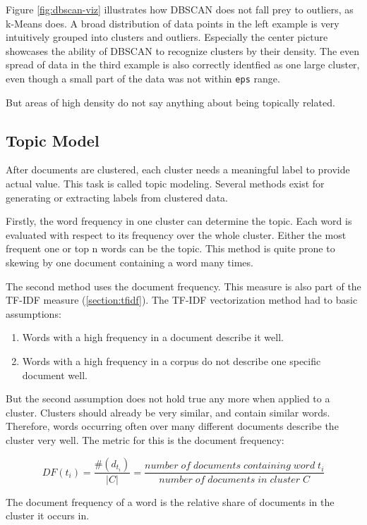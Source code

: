 		Figure \ref{fig:dbscan-viz} illustrates how \ac{DBSCAN} does not fall prey to outliers, as k-Means does. A broad distribution of data points in the left example is very intuitively grouped into clusters and outliers. Especially the center picture showcases the ability of DBSCAN to recognize clusters by their density. The even spread of data in the third example is also correctly identfied as one large cluster, even though a small part of the data was not within \lstinline|eps| range.
		
		But areas of high density do not say anything about being topically related.

		
\subsection{Topic Model}
After documents are clustered, each cluster needs a meaningful label to provide actual value. This task is called topic modeling. Several methods exist for generating or extracting labels from clustered data. 

Firstly, the word frequency in one cluster can determine the topic. Each word is evaluated with respect to its frequency over the whole cluster. Either the most frequent one or top n words can be the topic.
This method is quite prone to skewing by one document containing a word many times.

The second method uses the document frequency. This measure is also part of the \ac{TF-IDF} measure (\ref{section:tfidf}).
The \ac{TF-IDF} vectorization method had to basic assumptions:
\begin{enumerate}
	\item Words with a high frequency in a document describe it well.
	\item Words with a high frequency in a corpus do not describe one specific document well.
\end{enumerate}

But the second assumption does not hold true any more when applied to a cluster. Clusters should already be very similar, and contain similar words. Therefore, words occurring often over many different documents describe the cluster very well. The metric for this is the document frequency:

\[ DF(t_{i}) =\dfrac{\#(d_{t_{i}}) }{|C|} = \dfrac{ number \; of \; documents \; containing \; word \; t_{i}}{number \;  of\;  documents \;  in \; cluster \; C} \]

The document frequency of a word is the relative share of documents in the cluster it occurs in.

